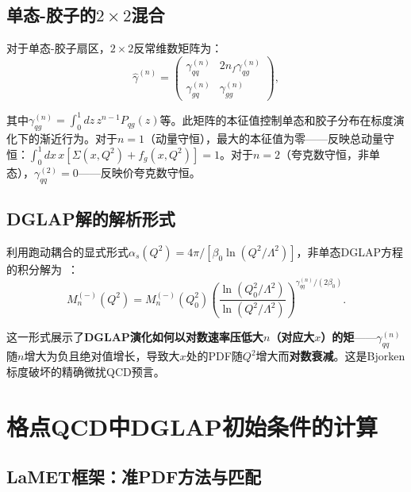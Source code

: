 \documentclass[12pt,a4paper]{ctexart}
\theoremstyle{definition}
\begin{document}
\subsection{单态-胶子的$2\times2$混合}

对于单态-胶子扇区，$2\times2$反常维数矩阵为：
\begin{equation}
\hat\gamma^{(n)} = \begin{pmatrix}
\gamma_{qq}^{(n)} & 2n_f \gamma_{qg}^{(n)} \\
\gamma_{gq}^{(n)} & \gamma_{gg}^{(n)}
\end{pmatrix},
\label{eq:singlet_anomalous}
\end{equation}

其中$\gamma_{qg}^{(n)} = \int_0^1 dz\, z^{n-1} P_{qg}(z)$等。此矩阵的本征值控制单态和胶子分布在标度演化下的渐近行为。对于$n=1$（动量守恒），最大的本征值为零——反映总动量守恒：$\int_0^1 dx\, x[\Sigma(x, Q^2) + f_g(x, Q^2)] = 1$。对于$n=2$（夸克数守恒，非单态），$\gamma_{qq}^{(2)} = 0$——反映价夸克数守恒。

\subsection{DGLAP解的解析形式}

利用跑动耦合的显式形式$\alpha_s(Q^2) = 4\pi/[\beta_0 \ln(Q^2/\Lambda^2)]$，非单态DGLAP方程的积分解为~\cite{PeskinSchroeder1995}：
\begin{equation}
M_n^{(-)}(Q^2) = M_n^{(-)}(Q_0^2) \left( \frac{\ln(Q_0^2/\Lambda^2)}{\ln(Q^2/\Lambda^2)} \right)^{\gamma_{qq}^{(n)}/(2\beta_0)}.
\label{eq:DGLAP_solution}
\end{equation}

这一形式展示了\textbf{DGLAP演化如何以对数速率压低大$n$（对应大$x$）的矩}——$\gamma_{qq}^{(n)}$随$n$增大为负且绝对值增长，导致大$x$处的PDF随$Q^2$增大而\textbf{对数衰减}。这是Bjorken标度破坏的精确微扰QCD预言。

\section{格点QCD中DGLAP初始条件的计算}

\subsection{LaMET框架：准PDF方法与匹配}
\end{document}
